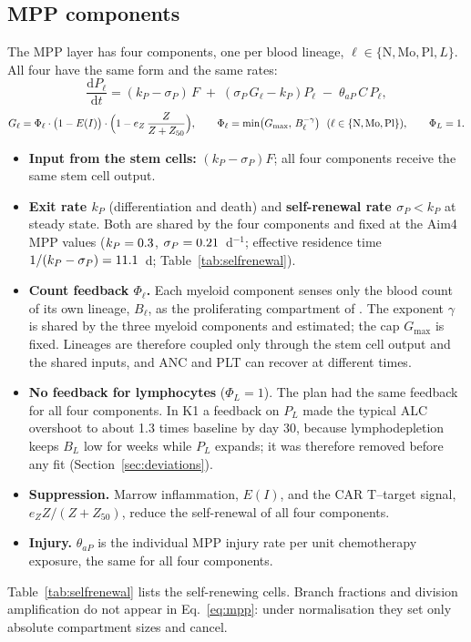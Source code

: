 \documentclass[11pt]{article}
\newcommand{\dd}{\mathrm{d}}
\begin{document}
\subsection{MPP components}\label{sec:mpp}
The MPP layer has four components, one per blood lineage, $\ell\in\{\mathrm{N},\mathrm{Mo},\mathrm{Pl},L\}$. All four have the same form and the same rates:
\begin{equation}
\frac{\dd P_\ell}{\dd t} = (k_P-\sigma_P)\,F \;+\; \left(\sigma_P\,G_\ell - k_P\right) P_\ell \;-\; \theta_{aP}\,C\,P_\ell, \label{eq:mpp}
\end{equation}
\begin{equation}
G_\ell = \Phi_\ell\cdot\bigl(1-E(I)\bigr)\cdot\Bigl(1-e_Z\,\frac{Z}{Z+Z_{50}}\Bigr),\qquad
\Phi_\ell=\min\bigl(G_{\max},\,B_\ell^{-\gamma}\bigr)\ \ (\ell\in\{\mathrm{N},\mathrm{Mo},\mathrm{Pl}\}),\qquad \Phi_L=1. \label{eq:G}
\end{equation}
\begin{itemize}
\item \textbf{Input from the stem cells:} $(k_P-\sigma_P)F$; all four components receive the same stem cell output.
\item \textbf{Exit rate $k_P$} (differentiation and death) and \textbf{self-renewal rate $\sigma_P<k_P$} at steady state. Both are shared by the four components and fixed at the Aim4 MPP values ($k_P=0.3$, $\sigma_P=0.21$~d$^{-1}$; effective residence time $1/(k_P-\sigma_P)=11.1$~d; Table~\ref{tab:selfrenewal}).
\item \textbf{Count feedback $\Phi_\ell$.} Each myeloid component senses only the blood count of its own lineage, $B_\ell$, as the proliferating compartment of \citet{friberg2002}. The exponent $\gamma$ is shared by the three myeloid components and estimated; the cap $G_{\max}$ is fixed. Lineages are therefore coupled only through the stem cell output and the shared inputs, and ANC and PLT can recover at different times.
\item \textbf{No feedback for lymphocytes} ($\Phi_L=1$). The plan had the same feedback for all four components. In K1 a feedback on $P_L$ made the typical ALC overshoot to about 1.3 times baseline by day 30, because lymphodepletion keeps $B_L$ low for weeks while $P_L$ expands; it was therefore removed before any fit (Section~\ref{sec:deviations}).
\item \textbf{Suppression.} Marrow inflammation, $E(I)$, and the CAR T--target signal, $e_Z Z/(Z+Z_{50})$, reduce the self-renewal of all four components.
\item \textbf{Injury.} $\theta_{aP}$ is the individual MPP injury rate per unit chemotherapy exposure, the same for all four components.
\end{itemize}
Table~\ref{tab:selfrenewal} lists the self-renewing cells. Branch fractions and division amplification do not appear in Eq.~\ref{eq:mpp}: under normalisation they set only absolute compartment sizes and cancel.
\end{document}
